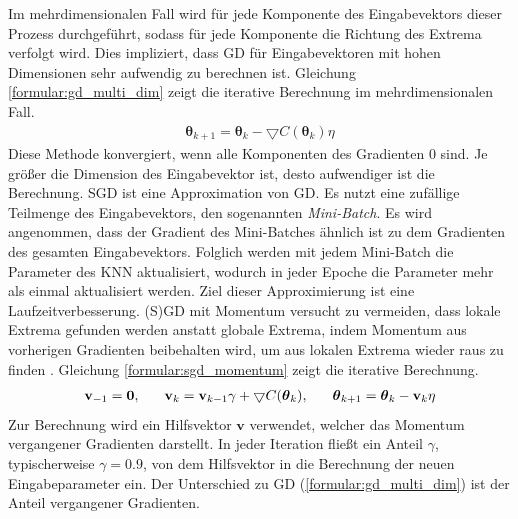 \newline
\newline
Im mehrdimensionalen Fall wird für jede Komponente des Eingabevektors dieser Prozess durchgeführt, sodass für jede Komponente
die Richtung des Extrema verfolgt wird.
Dies impliziert, dass GD für Eingabevektoren mit hohen Dimensionen sehr aufwendig zu berechnen ist.
Gleichung \ref{formular:gd_multi_dim} zeigt die iterative Berechnung im mehrdimensionalen Fall.
\begin{align}
    \label{formular:gd_multi_dim}
    \boldsymbol\theta_{k+1} = \boldsymbol\theta_k - \bigtriangledown C(\boldsymbol\theta_k)\eta
\end{align}
Diese Methode konvergiert, wenn alle Komponenten des Gradienten 0 sind.
Je größer die Dimension des Eingabevektor ist, desto aufwendiger ist die Berechnung.
\newline
\newline
SGD ist eine Approximation von GD. Es nutzt eine zufällige Teilmenge des Eingabevektors, den sogenannten \textit{Mini-Batch}.
Es wird angenommen, dass der Gradient des Mini-Batches ähnlich ist zu dem Gradienten des gesamten Eingabevektors.
Folglich werden mit jedem Mini-Batch die Parameter des KNN aktualisiert, wodurch in jeder Epoche die Parameter mehr als einmal aktualisiert werden.
Ziel dieser Approximierung ist eine Laufzeitverbesserung.
\newline
\newline
(S)GD mit Momentum versucht zu vermeiden, dass lokale Extrema gefunden werden anstatt globale Extrema, indem Momentum aus
vorherigen Gradienten beibehalten wird, um aus lokalen Extrema wieder raus zu finden \cite{higham2019deep}.
Gleichung \ref{formular:sgd_momentum} zeigt die iterative Berechnung.
\begin{align}
    \label{formular:sgd_momentum}
    \textbf{v}_{-1} = \textbf{0}, \hspace{0.6cm} \textbf{v}_k = \textbf{v}_{k-1}\gamma +
    \bigtriangledown C(\boldsymbol\theta_k), \hspace{0.6cm} \boldsymbol\theta_{k+1} = \boldsymbol\theta_k - \textbf{v}_k\eta
\end{align}
Zur Berechnung wird ein Hilfsvektor $\textbf{v}$ verwendet, welcher das Momentum vergangener Gradienten darstellt.
In jeder Iteration fließt ein Anteil $\gamma$, typischerweise $\gamma=0.9$, von dem Hilfsvektor in die Berechnung der neuen Eingabeparameter ein.
Der Unterschied zu GD (\ref{formular:gd_multi_dim}) ist der Anteil vergangener Gradienten.
\newline
